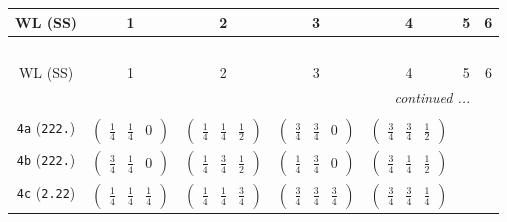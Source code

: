 \documentclass[fleqn,9pt,landscape]{jsarticle}
\begin{document}
\begin{center}
\renewcommand{\arraystretch}{1.2}
\begin{longtable}{ccccccc}
 \hline \hline
WL (SS) & 1 & 2 & 3 & 4 & 5 & 6 \\ \hline \endfirsthead

\multicolumn{6}{l}{\tablename\ \thetable{}} \\
 \hline \hline
WL (SS) & 1 & 2 & 3 & 4 & 5 & 6 \\ \hline \endhead

 \hline \hline
\multicolumn{6}{r}{\footnotesize\it continued ...} \\ \endfoot

 \hline \hline
\multicolumn{6}{r}{} \\ \endlastfoot

{\tt 4a} ({\tt 222.}) & $ \begin{pmatrix} \frac{1}{4} & \frac{1}{4} & 0 \end{pmatrix} $ & $ \begin{pmatrix} \frac{1}{4} & \frac{1}{4} & \frac{1}{2} \end{pmatrix} $ & $ \begin{pmatrix} \frac{3}{4} & \frac{3}{4} & 0 \end{pmatrix} $ & $ \begin{pmatrix} \frac{3}{4} & \frac{3}{4} & \frac{1}{2} \end{pmatrix} $ & $  $ & $  $ \\ \hline
{\tt 4b} ({\tt 222.}) & $ \begin{pmatrix} \frac{3}{4} & \frac{1}{4} & 0 \end{pmatrix} $ & $ \begin{pmatrix} \frac{1}{4} & \frac{3}{4} & \frac{1}{2} \end{pmatrix} $ & $ \begin{pmatrix} \frac{1}{4} & \frac{3}{4} & 0 \end{pmatrix} $ & $ \begin{pmatrix} \frac{3}{4} & \frac{1}{4} & \frac{1}{2} \end{pmatrix} $ & $  $ & $  $ \\ \hline
{\tt 4c} ({\tt 2.22}) & $ \begin{pmatrix} \frac{1}{4} & \frac{1}{4} & \frac{1}{4} \end{pmatrix} $ & $ \begin{pmatrix} \frac{1}{4} & \frac{1}{4} & \frac{3}{4} \end{pmatrix} $ & $ \begin{pmatrix} \frac{3}{4} & \frac{3}{4} & \frac{3}{4} \end{pmatrix} $ & $ \begin{pmatrix} \frac{3}{4} & \frac{3}{4} & \frac{1}{4} \end{pmatrix} $ & $  $ & $  $ \\ \hline

\end{longtable}
\end{center}
\end{document}
